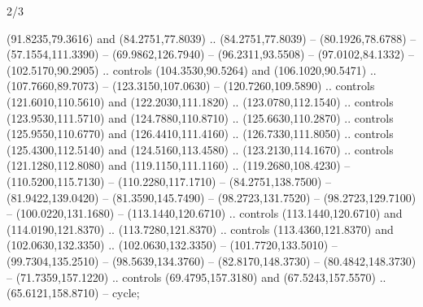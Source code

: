 \begin{flagdescription}{2/3}
\begin{scope}[scale=\flagwidth/600]
\begin{scope}[y=-1pt, x=1pt,yshift=600]
  (91.8235,79.3616) and (84.2751,77.8039) .. (84.2751,77.8039) --
  (80.1926,78.6788) -- (57.1554,111.3390) -- (69.9862,126.7940) --
  (96.2311,93.5508) -- (97.0102,84.1332) -- (102.5170,90.2905) .. controls
  (104.3530,90.5264) and (106.1020,90.5471) .. (107.7660,89.7073) --
  (123.3150,107.0630) -- (120.7260,109.5890) .. controls (121.6010,110.5610) and
  (122.2030,111.1820) .. (123.0780,112.1540) .. controls (123.9530,111.5710) and
  (124.7880,110.8710) .. (125.6630,110.2870) .. controls (125.9550,110.6770) and
  (126.4410,111.4160) .. (126.7330,111.8050) .. controls (125.4300,112.5140) and
  (124.5160,113.4580) .. (123.2130,114.1670) .. controls (121.1280,112.8080) and
  (119.1150,111.1160) .. (119.2680,108.4230) -- (110.5200,115.7130) --
  (110.2280,117.1710) -- (84.2751,138.7500) -- (81.9422,139.0420) --
  (81.3590,145.7490) -- (98.2723,131.7520) -- (98.2723,129.7100) --
  (100.0220,131.1680) -- (113.1440,120.6710) .. controls (113.1440,120.6710) and
  (114.0190,121.8370) .. (113.7280,121.8370) .. controls (113.4360,121.8370) and
  (102.0630,132.3350) .. (102.0630,132.3350) -- (101.7720,133.5010) --
  (99.7304,135.2510) -- (98.5639,134.3760) -- (82.8170,148.3730) --
  (80.4842,148.3730) -- (71.7359,157.1220) .. controls (69.4795,157.3180) and
  (67.5243,157.5570) .. (65.6121,158.8710) -- cycle;
\end{scope}
\end{scope}
\framecode{}
\end{flagdescription}
